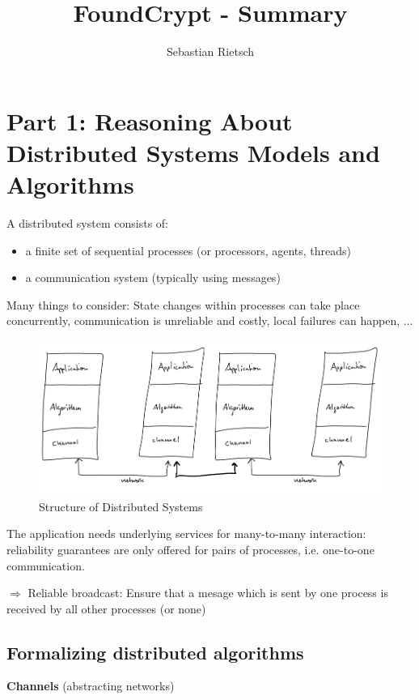 \documentclass{scrartcl}
\title{FoundCrypt - Summary}
\author{Sebastian Rietsch}
\begin{document}
\maketitle
\tableofcontents

\section{Part 1: Reasoning About Distributed Systems Models and Algorithms}
A distributed system consists of:
\begin{itemize}
    \item
        a finite set of sequential processes (or processors, agents, threads)
    \item
        a communication system (typically using messages)
\end{itemize}
Many things to consider: State changes within processes can take place concurrently, communication is unreliable and costly, local failures can happen, ...

\begin{figure}
    \begin{center}
        \includegraphics[scale=0.5]{img/distsys}
        \caption{Structure of Distributed Systems}
    \end{center}
\end{figure}

\bigbreak

The application needs underlying services for many-to-many interaction: reliability guarantees are only offered for pairs of processes, i.e. one-to-one communication.

\(\Rightarrow\) Reliable broadcast: Ensure that a mesage which is sent by one process is received by all other processes (or none)

\subsection{Formalizing distributed algorithms}
\textbf{Channels} (abstracting networks)
\end{document}
